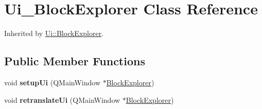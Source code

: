 \hypertarget{class_ui___block_explorer}{}\section{Ui\+\_\+\+Block\+Explorer Class Reference}
\label{class_ui___block_explorer}


Inherited by \mbox{\hyperlink{class_ui_1_1_block_explorer}{Ui\+::\+Block\+Explorer}}.

\subsection*{Public Member Functions}
\begin{DoxyCompactItemize}
\item 
\mbox{\label{class_ui___block_explorer_ac8ea82f41d56c3329e26011c9eec2ddf}} 
void {\bfseries setup\+Ui} (Q\+Main\+Window $\ast$\mbox{\hyperlink{class_block_explorer}{Block\+Explorer}})
\item 
\mbox{\label{class_ui___block_explorer_a060b69624fe02a007e5153098896750b}} 
void {\bfseries retranslate\+Ui} (Q\+Main\+Window $\ast$\mbox{\hyperlink{class_block_explorer}{Block\+Explorer}})
\end{DoxyCompactItemize}
